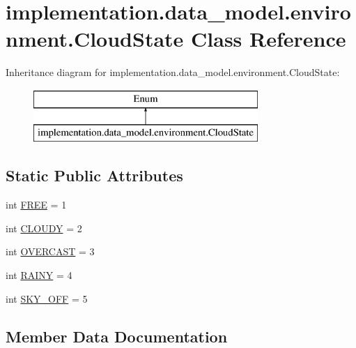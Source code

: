 \hypertarget{classimplementation_1_1data__model_1_1environment_1_1_cloud_state}{}\section{implementation.\+data\+\_\+model.\+environment.\+Cloud\+State Class Reference}
\label{classimplementation_1_1data__model_1_1environment_1_1_cloud_state}
Inheritance diagram for implementation.\+data\+\_\+model.\+environment.\+Cloud\+State\+:\begin{figure}[H]
\begin{center}
\leavevmode
\includegraphics[height=2.000000cm]{classimplementation_1_1data__model_1_1environment_1_1_cloud_state}
\end{center}
\end{figure}
\subsection*{Static Public Attributes}
\begin{DoxyCompactItemize}
\item 
int \hyperlink{classimplementation_1_1data__model_1_1environment_1_1_cloud_state_a1679ec829e242670aca715b8cd3b056e}{F\+R\+EE} = 1
\item 
int \hyperlink{classimplementation_1_1data__model_1_1environment_1_1_cloud_state_a44ce6c694691a43221b7b3981a250807}{C\+L\+O\+U\+DY} = 2
\item 
int \hyperlink{classimplementation_1_1data__model_1_1environment_1_1_cloud_state_a450787a5846864ae481bb94b196cc622}{O\+V\+E\+R\+C\+A\+ST} = 3
\item 
int \hyperlink{classimplementation_1_1data__model_1_1environment_1_1_cloud_state_a418bf3040ff7a0429a426d86942dcea3}{R\+A\+I\+NY} = 4
\item 
int \hyperlink{classimplementation_1_1data__model_1_1environment_1_1_cloud_state_a4ca8feddafca201b25c2616622a75187}{S\+K\+Y\+\_\+\+O\+FF} = 5
\end{DoxyCompactItemize}


\subsection{Member Data Documentation}
\mbox{\label{classimplementation_1_1data__model_1_1environment_1_1_cloud_state_a44ce6c694691a43221b7b3981a250807}} 
